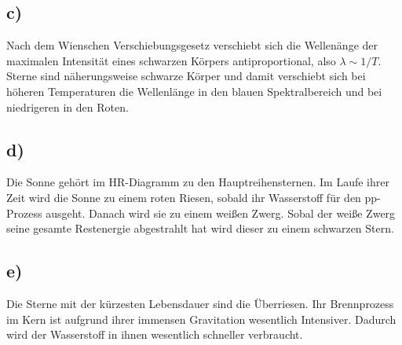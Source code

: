 \subsection{c)}

Nach dem Wienschen Verschiebungsgesetz verschiebt sich die Wellenänge der maximalen Intensität eines schwarzen Körpers
antiproportional, also $\lambda \sim 1/T $. Sterne sind näherungsweise schwarze Körper und damit
verschiebt sich bei höheren Temperaturen die Wellenlänge in den blauen Spektralbereich und bei 
niedrigeren in den Roten.

\subsection{d)}

Die Sonne gehört im HR-Diagramm zu den Hauptreihensternen. Im Laufe ihrer Zeit wird die Sonne 
zu einem roten Riesen, sobald ihr Wasserstoff für den pp-Prozess ausgeht.
Danach wird sie zu einem weißen Zwerg. Sobal der weiße Zwerg seine gesamte Restenergie abgestrahlt hat
wird dieser zu einem schwarzen Stern.

\subsection{e)}

Die Sterne mit der kürzesten Lebensdauer sind die Überriesen. Ihr Brennprozess im Kern ist aufgrund ihrer
immensen Gravitation wesentlich Intensiver. Dadurch wird der Wasserstoff in ihnen wesentlich schneller verbraucht.




